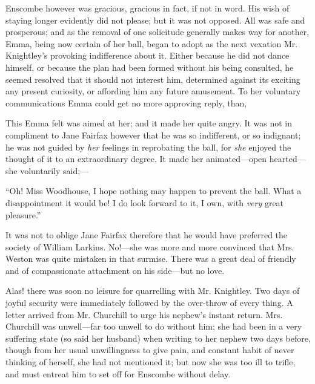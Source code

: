 Enscombe however was gracious, gracious in fact, if not in word. His wish of staying longer evidently did not please; but it was not opposed. All was safe and prosperous; and as the removal of one solicitude generally makes way for another, Emma, being now certain of her ball, began to adopt as the next vexation Mr. Knightley's provoking indifference about it. Either because he did not dance himself, or because the plan had been formed without his being consulted, he seemed resolved that it should not interest him, determined against its exciting any present curiosity, or affording him any future amusement. To her voluntary communications Emma could get no more approving reply, than,


This Emma felt was aimed at her; and it made her quite angry. It was not in compliment to Jane Fairfax however that he was so indifferent, or so indignant; he was not guided by {\em her} feelings in reprobating the ball, for {\em she} enjoyed the thought of it to an extraordinary degree. It made her animated---open hearted---she voluntarily said;---

“Oh! Miss Woodhouse, I hope nothing may happen to prevent the ball. What a disappointment it would be! I do look forward to it, I own, with {\em very} great pleasure.”

It was not to oblige Jane Fairfax therefore that he would have preferred the society of William Larkins. No!---she was more and more convinced that Mrs. Weston was quite mistaken in that surmise. There was a great deal of friendly and of compassionate attachment on his side---but no love.

Alas! there was soon no leisure for quarrelling with Mr. Knightley. Two days of joyful security were immediately followed by the over-throw of every thing. A letter arrived from Mr. Churchill to urge his nephew's instant return. Mrs. Churchill was unwell---far too unwell to do without him; she had been in a very suffering state (so said her husband) when writing to her nephew two days before, though from her usual unwillingness to give pain, and constant habit of never thinking of herself, she had not mentioned it; but now she was too ill to trifle, and must entreat him to set off for Enscombe without delay.

